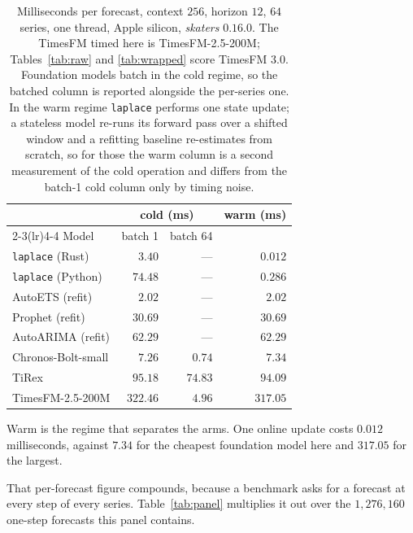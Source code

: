 \documentclass[article]{jss}
\providecommand{\proglang}[1]{\textsf{#1}}
\providecommand{\pkg}[1]{\textit{#1}}
\renewcommand{\pkg}[1]{\textit{#1}}
\providecommand{\code}[1]{\texttt{#1}}
\begin{document}
\begin{table}[t!]
\centering
\small
\begin{tabular}{lrrr}
\toprule
 & \multicolumn{2}{c}{cold (ms)} & warm (ms) \\
\cmidrule(lr){2-3}\cmidrule(lr){4-4}
Model & batch 1 & batch 64 & \\
\midrule
\code{laplace} (\proglang{Rust})   & $3.40$ & --- & $0.012$ \\
\code{laplace} (\proglang{Python}) & $74.48$ & --- & $0.286$ \\
AutoETS (refit)                     & $2.02$ & --- & $2.02$ \\
Prophet (refit)                     & $30.69$ & --- & $30.69$ \\
AutoARIMA (refit)                   & $62.29$ & --- & $62.29$ \\
Chronos-Bolt-small                  & $7.26$ & $0.74$ & $7.34$ \\
TiRex                               & $95.18$ & $74.83$ & $94.09$ \\
TimesFM-2.5-200M                    & $322.46$ & $4.96$ & $317.05$ \\
\bottomrule
\end{tabular}
\caption{Milliseconds per forecast, context $256$, horizon $12$, $64$ series,
one thread, Apple silicon, \pkg{skaters} $0.16.0$. The TimesFM timed here is
TimesFM-2.5-200M; Tables~\ref{tab:raw} and \ref{tab:wrapped} score TimesFM 3.0.
Foundation models batch in
the cold regime, so the batched column is reported alongside the per-series one.
In the warm regime \code{laplace} performs one state update; a stateless model
re-runs its forward pass over a shifted window and a refitting baseline
re-estimates from scratch, so for those the warm column is a second measurement
of the cold operation and differs from the batch-1 cold column only by timing
noise.}
\label{tab:perf}
\end{table}

Warm is the regime that separates the arms. One online update costs $0.012$
milliseconds, against $7.34$ for the cheapest foundation model here and $317.05$
for the largest.

That per-forecast figure compounds, because a benchmark asks for a forecast at
every step of every series. Table~\ref{tab:panel} multiplies it out over the
$1{,}276{,}160$ one-step forecasts this panel contains.
\end{document}
